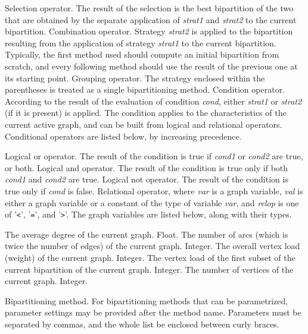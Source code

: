 \begin{itemize}
Selection operator. The result of the selection is the best bipartition of
the two that are obtained by the separate application of {\it strat1\/} and
{\it strat2\/} to the current bipartition.
Combination operator. Strategy {\it strat2\/} is applied to the bipartition
resulting from the application of strategy {\it strat1\/} to the current
bipartition. Typically, the first method used should compute an initial
bipartition from scratch, and every following method should use the
result of the previous one at its starting point.
\iteme[{\tt (}{\it strat\/}{\tt )}]
Grouping operator.
The strategy enclosed within the parentheses is treated as a single
bipartitioning method.
Condition operator. According to the result of the evaluation of condition
{\it cond}, either {\it strat1\/} or {\it strat2\/} (if it is present) is
applied. The condition applies to the characteristics of the current active
graph, and can be built from logical and relational operators. Conditional
operators are listed below, by increasing precedence.
\begin{itemize}
Logical or operator. The result of the condition is true if {\it cond1\/}
or {\it cond2\/} are true, or both.
Logical and operator. The result of the condition is true only if both
{\it cond1\/} and {\it cond2\/} are true.
\iteme[{\tt !}{\it cond}]
Logical not operator. The result of the condition is true only if
{\it cond\/} is false.
Relational operator, where {\it var\/} is a graph variable, {\it val\/} is
either a graph variable or a constant of the type of variable {\it var\/}, and
{\it relop\/} is one of '{\tt\verb+<+}', '{\tt\verb+=+}', and '{\tt\verb+>+}'.
The graph variables are listed below, along with their types.
\begin{itemize}
\iteme[{\tt deg}]
The average degree of the current graph.
Float.
\iteme[{\tt edge}]
The number of arcs (which is twice the number of edges) of the current graph.
Integer.
\iteme[{\tt load}]
The overall vertex load (weight) of the current graph.
Integer.
\iteme[{\tt load0}]
The vertex load of the first subset of the current bipartition of the current
graph.
Integer.
\iteme[{\tt vert}]
The number of vertices of the current graph.
Integer.
\end{itemize}
\end{itemize}
\iteme[{\it method\/}{[{\tt \{}{\it parameters\/}{\tt \}}]}]
Bipartitioning method. For bipartitioning methods that can be
parametrized, parameter settings may be provided after the method
name. Parameters must be separated by commas, and the whole list
be enclosed between curly braces.
\end{itemize}
